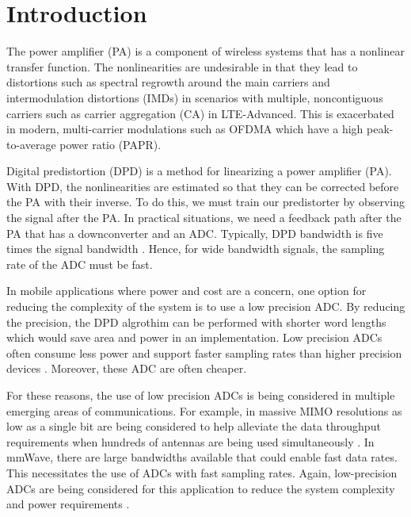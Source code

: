 \documentclass[conference]{IEEEtran}
\begin{document}




%


\section{Introduction}
The power amplifier (PA) is a component of wireless systems that has a nonlinear transfer function. 
The nonlinearities are undesirable in that they lead to distortions such as spectral regrowth around the main carriers and intermodulation distortions (IMDs) in scenarios with multiple, noncontiguous carriers such as carrier aggregation (CA) in LTE-Advanced. 
This is exacerbated in modern, multi-carrier modulations such as OFDMA which have a high peak-to-average power ratio (PAPR). 

Digital predistortion (DPD) is a method for linearizing a power amplifier (PA). 
With DPD, the nonlinearities are estimated so that they can be corrected before the PA with their inverse.
To do this, we must train our predistorter by observing the signal after the PA.
In practical situations, we need a feedback path after the PA that has a downconverter and an ADC.
Typically, DPD bandwidth is five times the signal bandwidth  \cite{Katz2016}. Hence, for wide bandwidth signals, the sampling rate of the ADC must be fast. 

In mobile applications where power and cost are a concern, one option for reducing the complexity of the system is to use a low precision ADC. 
By reducing the precision, the DPD algrothim can be performed with shorter word lengths which would save area and power in an implementation. 
Low precision ADCs often consume less power and support faster sampling rates than higher precision devices \cite{Walden99}. Moreover, these ADC are often cheaper. 

For these reasons, the use of low precision ADCs is being considered in multiple emerging areas of communications. For example, in massive MIMO resolutions as low as a single bit are being considered to help alleviate the data throughput requirements when hundreds of antennas are being used simultaneously \cite{MIMOAdcs}. In mmWave, there are large bandwidths available that could enable fast data rates. This necessitates the use of ADCs with fast sampling rates. Again, low-precision ADCs are being considered for this application to reduce the system complexity and power requirements \cite{Heath2015}. 
\end{document}
